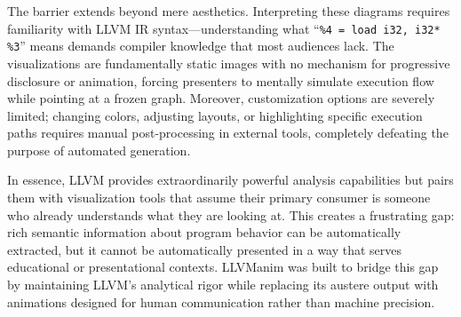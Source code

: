 The barrier extends beyond mere aesthetics. Interpreting these diagrams requires familiarity with LLVM IR syntax---understanding what ``\texttt{\%4 = load i32, i32* \%3}'' means demands compiler knowledge that most audiences lack. The visualizations are fundamentally static images with no mechanism for progressive disclosure or animation, forcing presenters to mentally simulate execution flow while pointing at a frozen graph. Moreover, customization options are severely limited; changing colors, adjusting layouts, or highlighting specific execution paths requires manual post-processing in external tools, completely defeating the purpose of automated generation.

In essence, LLVM provides extraordinarily powerful analysis capabilities but pairs them with visualization tools that assume their primary consumer is someone who already understands what they are looking at. This creates a frustrating gap: rich semantic information about program behavior can be automatically extracted, but it cannot be automatically presented in a way that serves educational or presentational contexts. LLVManim was built to bridge this gap by maintaining LLVM's analytical rigor while replacing its austere output with animations designed for human communication rather than machine precision.
